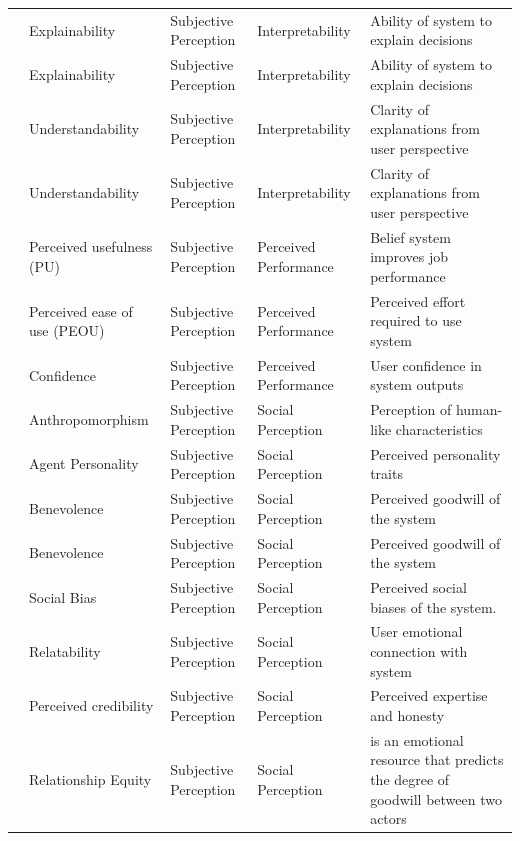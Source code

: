 \documentclass[sigconf]{acmart}
\begin{document}
\begin{longtable}{l l l l p{4cm}}
\cite{afroogh_trust_in_ai} & Explainability & Subjective Perception & Interpretability & Ability of system to explain decisions \\
\cite{Graaf_Malle_2017} & Explainability & Subjective Perception & Interpretability & Ability of system to explain decisions \\
\cite{naiseh_2023_class} & Understandability & Subjective Perception & Interpretability & Clarity of explanations from user perspective \\
\cite{Vaithilingam_Zhang_Glassman_2022} & Understandability & Subjective Perception & Interpretability & Clarity of explanations from user perspective \\
\cite{zhang_automated_vehicle_acceptance} & Perceived usefulness (PU) & Subjective Perception & Perceived Performance & Belief system improves job performance \\
\cite{zhang_automated_vehicle_acceptance} & Perceived ease of use (PEOU) & Subjective Perception & Perceived Performance & Perceived effort required to use system \\
\cite{hayes2017improving} & Confidence & Subjective Perception & Perceived Performance & User confidence in system outputs \\
\cite{chi_formative_scale} & Anthropomorphism & Subjective Perception & Social Perception & Perception of human-like characteristics \\
\cite{Rheuetal.2020.SystematicReviewTrustBuildingFactors} & Agent Personality & Subjective Perception & Social Perception & Perceived personality traits \\
\cite{yang_wibowo_2022} & Benevolence & Subjective Perception & Social Perception & Perceived goodwill of the system \\
\cite{afroogh_trust_in_ai} & Benevolence & Subjective Perception & Social Perception & Perceived goodwill of the system \\
\cite{afroogh_trust_in_ai} & Social Bias & Subjective Perception & Social Perception & Perceived social biases of the system. \\
\cite{bach_systematic_literature_review} & Relatability & Subjective Perception & Social Perception & User emotional connection with system \\
\cite{bach_systematic_literature_review} & Perceived credibility & Subjective Perception & Social Perception & Perceived expertise and honesty \\
\cite{de_visser_longitudinal_trust} & Relationship Equity & Subjective Perception & Social Perception & is an emotional resource that predicts the degree of goodwill between two actors \\

\end{longtable}
\end{document}
